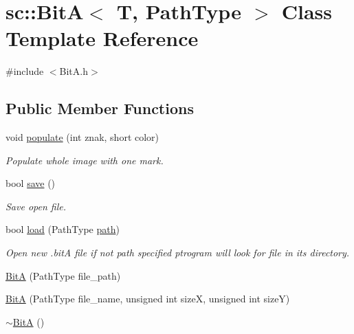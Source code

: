 \hypertarget{classsc_1_1_bit_a}{}\section{sc\+::BitA$<$ T, Path\+Type $>$ Class Template Reference}
\label{classsc_1_1_bit_a}


{\ttfamily \#include $<$Bit\+A.\+h$>$}

\subsection*{Public Member Functions}
\begin{DoxyCompactItemize}
\item 
void \mbox{\hyperlink{classsc_1_1_bit_a_ab103e16a25786a4e145a0b469502176b}{populate}} (int znak, short color)
\begin{DoxyCompactList}\small\item\em Populate whole image with one mark. \end{DoxyCompactList}\item 
bool \mbox{\hyperlink{classsc_1_1_bit_a_ad5e635670ca4015bbf720f35e5996c40}{save}} ()
\begin{DoxyCompactList}\small\item\em Save open file. \end{DoxyCompactList}\item 
bool \mbox{\hyperlink{classsc_1_1_bit_a_af262a95d7f00879e2759f9ef564d9cd9}{load}} (Path\+Type \mbox{\hyperlink{classsc_1_1_bit_a_a64708706afe986a022ec7eee4a75aca5}{path}})
\begin{DoxyCompactList}\small\item\em Open new .bitA file if not path specified ptrogram will look for file in its directory. \end{DoxyCompactList}\item 
\mbox{\hyperlink{classsc_1_1_bit_a_ae6186444c3c4d4150007ac242691488d}{BitA}} (Path\+Type file\+\_\+path)
\item 
\mbox{\hyperlink{classsc_1_1_bit_a_a33f4ad31b4fb529eb91352b9573ebd8a}{BitA}} (Path\+Type file\+\_\+name, unsigned int sizeX, unsigned int sizeY)
\item 
\mbox{\hyperlink{classsc_1_1_bit_a_af7f26417ea7ed2f803ad5b3c41bded7a}{$\sim$\+BitA}} ()
\end{DoxyCompactItemize}
